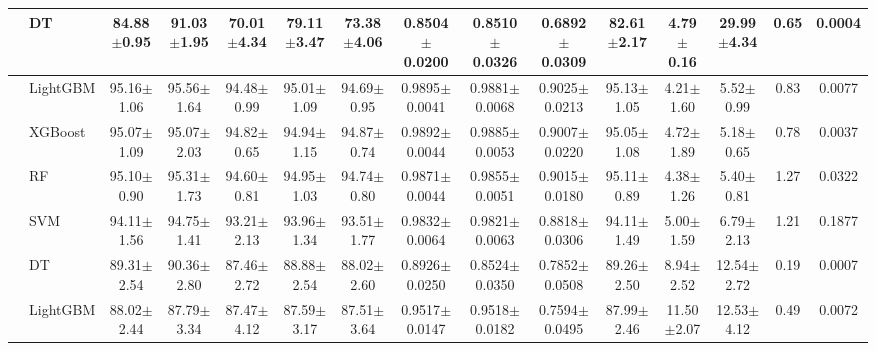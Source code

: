\begin{tabular}{@{}llccccccccccccc@{}}
 & DT & 84.88{\tiny$\pm$0.95} & 91.03{\tiny$\pm$1.95} & 70.01{\tiny$\pm$4.34} & 79.11{\tiny$\pm$3.47} & 73.38{\tiny$\pm$4.06} & 0.8504{\tiny$\pm$0.0200} & 0.8510{\tiny$\pm$0.0326} & 0.6892{\tiny$\pm$0.0309} & 82.61{\tiny$\pm$2.17} & 4.79{\tiny$\pm$0.16} & 29.99{\tiny$\pm$4.34} & 0.65 & 0.0004\\
\midrule
{} & LightGBM & 95.16{\tiny$\pm$1.06} & 95.56{\tiny$\pm$1.64} & 94.48{\tiny$\pm$0.99} & 95.01{\tiny$\pm$1.09} & 94.69{\tiny$\pm$0.95} & 0.9895{\tiny$\pm$0.0041} & 0.9881{\tiny$\pm$0.0068} & 0.9025{\tiny$\pm$0.0213} & 95.13{\tiny$\pm$1.05} & 4.21{\tiny$\pm$1.60} & 5.52{\tiny$\pm$0.99} & 0.83 & 0.0077\\
 & XGBoost & 95.07{\tiny$\pm$1.09} & 95.07{\tiny$\pm$2.03} & 94.82{\tiny$\pm$0.65} & 94.94{\tiny$\pm$1.15} & 94.87{\tiny$\pm$0.74} & 0.9892{\tiny$\pm$0.0044} & 0.9885{\tiny$\pm$0.0053} & 0.9007{\tiny$\pm$0.0220} & 95.05{\tiny$\pm$1.08} & 4.72{\tiny$\pm$1.89} & 5.18{\tiny$\pm$0.65} & 0.78 & 0.0037\\
 & RF & 95.10{\tiny$\pm$0.90} & 95.31{\tiny$\pm$1.73} & 94.60{\tiny$\pm$0.81} & 94.95{\tiny$\pm$1.03} & 94.74{\tiny$\pm$0.80} & 0.9871{\tiny$\pm$0.0044} & 0.9855{\tiny$\pm$0.0051} & 0.9015{\tiny$\pm$0.0180} & 95.11{\tiny$\pm$0.89} & 4.38{\tiny$\pm$1.26} & 5.40{\tiny$\pm$0.81} & 1.27 & 0.0322\\
 & SVM & 94.11{\tiny$\pm$1.56} & 94.75{\tiny$\pm$1.41} & 93.21{\tiny$\pm$2.13} & 93.96{\tiny$\pm$1.34} & 93.51{\tiny$\pm$1.77} & 0.9832{\tiny$\pm$0.0064} & 0.9821{\tiny$\pm$0.0063} & 0.8818{\tiny$\pm$0.0306} & 94.11{\tiny$\pm$1.49} & 5.00{\tiny$\pm$1.59} & 6.79{\tiny$\pm$2.13} & 1.21 & 0.1877\\
 & DT & 89.31{\tiny$\pm$2.54} & 90.36{\tiny$\pm$2.80} & 87.46{\tiny$\pm$2.72} & 88.88{\tiny$\pm$2.54} & 88.02{\tiny$\pm$2.60} & 0.8926{\tiny$\pm$0.0250} & 0.8524{\tiny$\pm$0.0350} & 0.7852{\tiny$\pm$0.0508} & 89.26{\tiny$\pm$2.50} & 8.94{\tiny$\pm$2.52} & 12.54{\tiny$\pm$2.72} & 0.19 & 0.0007\\
\midrule
{} & LightGBM & 88.02{\tiny$\pm$2.44} & 87.79{\tiny$\pm$3.34} & 87.47{\tiny$\pm$4.12} & 87.59{\tiny$\pm$3.17} & 87.51{\tiny$\pm$3.64} & 0.9517{\tiny$\pm$0.0147} & 0.9518{\tiny$\pm$0.0182} & 0.7594{\tiny$\pm$0.0495} & 87.99{\tiny$\pm$2.46} & 11.50{\tiny$\pm$2.07} & 12.53{\tiny$\pm$4.12} & 0.49 & 0.0072\\

\end{tabular}
